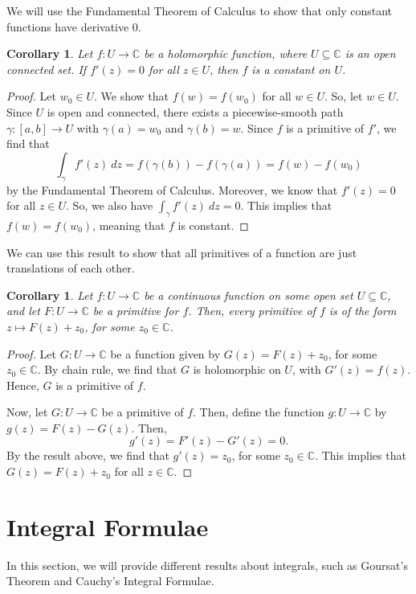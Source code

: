 \documentclass[a4paper, openany]{memoir}
\theoremstyle{definition}
\theoremstyle{plain}
\newtheorem{corollary}[definition]{Corollary}
\begin{document}
    We will use the Fundamental Theorem of Calculus to show that only constant functions have derivative 0.
    \begin{corollary}
        Let $f \colon U \to \mathbb{C}$ be a holomorphic function, where $U \subseteq \mathbb{C}$ is an open connected set. If $f'(z) = 0$ for all $z \in U$, then $f$ is a constant on $U$.
    \end{corollary}
    \begin{proof}
        Let $w_0 \in U$. We show that $f(w) = f(w_0)$ for all $w \in U$. So, let $w \in U$. Since $U$ is open and connected, there exists a piecewise-smooth path $\gamma \colon [a, b] \to U$ with $\gamma(a) = w_0$ and $\gamma(b) = w$. Since $f$ is a primitive of $f'$, we find that 
        \[\int_\gamma f'(z) \ dz = f(\gamma(b)) - f(\gamma(a)) = f(w) - f(w_0)\]
        by the Fundamental Theorem of Calculus. Moreover, we know that $f'(z) = 0$ for all $z \in U$. So, we also have $\int_\gamma f'(z) \ dz = 0$. This implies that $f(w) = f(w_0)$, meaning that $f$ is constant.
    \end{proof}

    We can use this result to show that all primitives of a function are just translations of each other.
    \begin{corollary}
        Let $f \colon U \to \mathbb{C}$ be a continuous function on some open set $U \subseteq \mathbb{C}$, and let $F \colon U \to \mathbb{C}$ be a primitive for $f$. Then, every primitive of $f$ is of the form $z \mapsto F(z) + z_0$, for some $z_0 \in \mathbb{C}$.
    \end{corollary}
    \begin{proof}
        Let $G \colon U \to \mathbb{C}$ be a function given by $G(z) = F(z) + z_0$, for some $z_0 \in \mathbb{C}$. By chain rule, we find that $G$ is holomorphic on $U$, with $G'(z) = f(z)$. Hence, $G$ is a primitive of $f$.

        Now, let $G \colon U \to \mathbb{C}$ be a primitive of $f$. Then, define the function $g \colon U \to \mathbb{C}$ by $g(z) = F(z) - G(z)$. Then,
        \[g'(z) = F'(z) - G'(z) = 0.\]
        By the result above, we find that $g'(z) = z_0$, for some $z_0 \in \mathbb{C}$. This implies that $G(z) = F(z) + z_0$ for all $z \in \mathbb{C}$.
    \end{proof}
    \newpage

    \section{Integral Formulae}
    In this section, we will provide different results about integrals, such as Goursat's Theorem and Cauchy's Integral Formulae.
\end{document}
